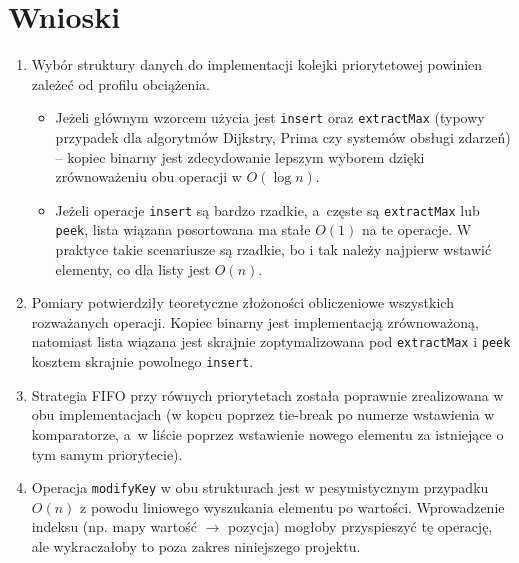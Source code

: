 \section{Wnioski}

\begin{enumerate}
    \item Wybór struktury danych do implementacji kolejki priorytetowej
          powinien zależeć od profilu obciążenia.
          \begin{itemize}
              \item Jeżeli głównym wzorcem użycia jest \texttt{insert} oraz
                    \texttt{extractMax} (typowy przypadek dla algorytmów
                    Dijkstry, Prima czy systemów obsługi zdarzeń) -- kopiec
                    binarny jest zdecydowanie lepszym wyborem dzięki
                    zrównoważeniu obu operacji w $O(\log n)$.
              \item Jeżeli operacje \texttt{insert} są bardzo rzadkie,
                    a~częste są \texttt{extractMax} lub \texttt{peek}, lista
                    wiązana posortowana ma stałe $O(1)$ na te operacje.
                    W praktyce takie scenariusze są rzadkie, bo i tak należy
                    najpierw wstawić elementy, co dla listy jest $O(n)$.
          \end{itemize}
    \item Pomiary potwierdziły teoretyczne złożoności obliczeniowe wszystkich
          rozważanych operacji. Kopiec binarny jest implementacją zrównoważoną,
          natomiast lista wiązana jest skrajnie zoptymalizowana pod
          \texttt{extractMax} i \texttt{peek} kosztem skrajnie powolnego
          \texttt{insert}.
    \item Strategia FIFO przy równych priorytetach została poprawnie
          zrealizowana w obu implementacjach (w kopcu poprzez tie-break
          po numerze wstawienia w komparatorze, a~w liście poprzez wstawienie
          nowego elementu za istniejące o tym samym priorytecie).
    \item Operacja \texttt{modifyKey} w obu strukturach jest w pesymistycznym
          przypadku $O(n)$ z powodu liniowego wyszukania elementu po
          wartości. Wprowadzenie indeksu (np. mapy wartość $\to$ pozycja)
          mogłoby przyspieszyć tę operację, ale wykraczałoby to poza zakres
          niniejszego projektu.
\end{enumerate}


